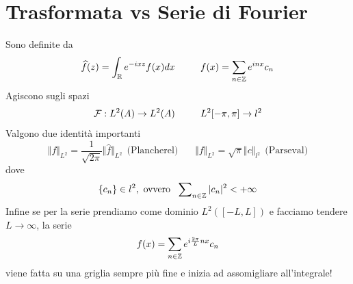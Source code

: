 \section{Trasformata vs Serie di Fourier}

Sono definite da
\begin{equation*}
\widehat{f}(z) = \int_{\mathbb{R}} e^{- ixz} f(x) dx\ \ \ \ \ \ \ \ f(x) = \sum_{n\in \mathbb{Z}} e^{inx} c_{n}
\end{equation*}
Agiscono sugli spazi
\begin{equation*}
\mathcal{F} : L^{2}(A)\rightarrow L^{2}(A) \ \ \ \ \ \ \ \ L^{2}[ - \pi, \pi]\rightarrow l^{2}
\end{equation*}
Valgono due identità importanti
\begin{equation*}
\Vert f \Vert_{L^{2}} = \frac{1}{\sqrt{2\pi}} \Vert \hat{f} \Vert_{L^{2}} \ \ \text{(Plancherel)} \ \ \ \ \ \ \ \ \Vert f \Vert_{L^{2}} = \sqrt{\pi} \Vert c \Vert_{l^{2}} \ \ \text{(Parseval)}
\end{equation*}
dove
\begin{equation*}
\{c_{n}\} \in l^{2}, \ \text{ovvero} \ \ \sum\nolimits_{n\in \ZZ}| c_{n}|^{2} < + \infty
\end{equation*}
Infine se per la serie prendiamo come dominio $L^{2}([ - L, L])$ e facciamo tendere $L\rightarrow \infty $, la serie
\begin{equation*}
f(x) = \sum_{n\in \mathbb{Z}} e^{i\frac{2\pi}{L} nx} c_{n}
\end{equation*}
viene fatta su una griglia sempre più fine e inizia ad assomigliare all'integrale!

